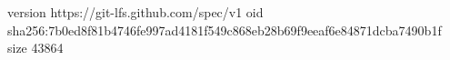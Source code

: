 version https://git-lfs.github.com/spec/v1
oid sha256:7b0ed8f81b4746fe997ad4181f549c868eb28b69f9eeaf6e84871dcba7490b1f
size 43864
